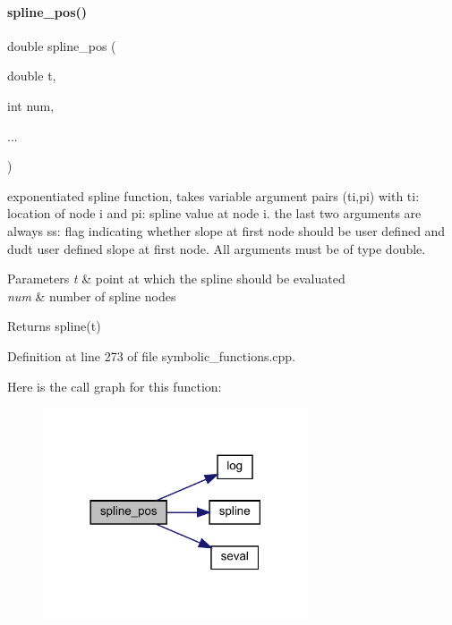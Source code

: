 \paragraph{\texorpdfstring{spline\_pos()}{spline\_pos()}}
{\footnotesize\ttfamily double spline\+\_\+pos (\begin{DoxyParamCaption}\item[{double}]{t,  }\item[{int}]{num,  }\item[{}]{... }\end{DoxyParamCaption})}

exponentiated spline function, takes variable argument pairs (ti,pi) with {\ttfamily ti}\+: location of node i and {\ttfamily pi}\+: spline value at node i. the last two arguments are always {\ttfamily ss}\+: flag indicating whether slope at first node should be user defined and {\ttfamily dudt} user defined slope at first node. All arguments must be of type double.


\begin{DoxyParams}{Parameters}
{\em t} & point at which the spline should be evaluated \\
\hline
{\em num} & number of spline nodes\\
\hline
\end{DoxyParams}
\begin{DoxyReturn}{Returns}
spline(t) 
\end{DoxyReturn}


Definition at line 273 of file symbolic\+\_\+functions.\+cpp.

Here is the call graph for this function\+:
\nopagebreak
\begin{figure}[H]
\begin{center}
\leavevmode
\includegraphics[width=222pt]{namespaceamici_aa814c7e3b7d45495d0607f3af88027f6_cgraph}
\end{center}
\end{figure}
\mbox{\label{namespaceamici_ad4f5bcfd873d2945ed546194aa80c078}} 

